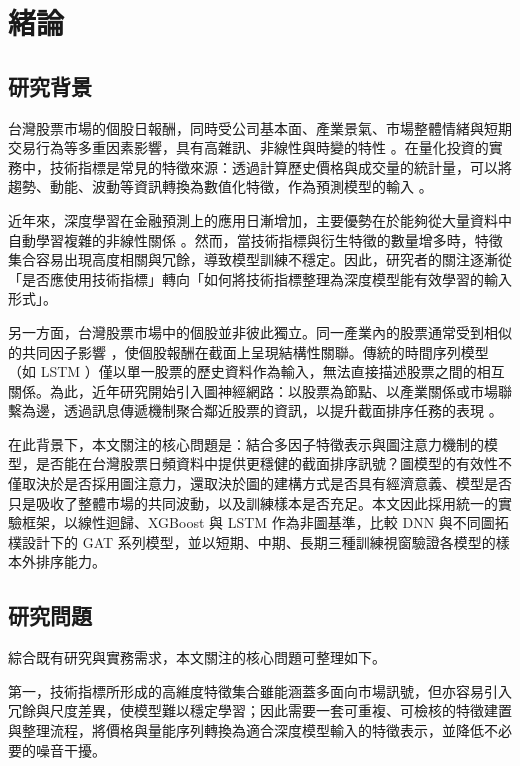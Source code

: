 \chapter{緒論}
\label{ch:intro}

\section{研究背景}
\label{sec:background}

台灣股票市場的個股日報酬，同時受公司基本面、產業景氣、市場整體情緒與短期交易行為等多重因素影響，具有高雜訊、非線性與時變的特性 \cite{gu2020empirical}。在量化投資的實務中，技術指標是常見的特徵來源：透過計算歷史價格與成交量的統計量，可以將趨勢、動能、波動等資訊轉換為數值化特徵，作為預測模型的輸入 \cite{Brock1992SimpleTT, LIN2018103}。

近年來，深度學習在金融預測上的應用日漸增加，主要優勢在於能夠從大量資料中自動學習複雜的非線性關係 \cite{gu2020empirical, sezer2019dl_fin_survey}。然而，當技術指標與衍生特徵的數量增多時，特徵集合容易出現高度相關與冗餘，導致模型訓練不穩定。因此，研究者的關注逐漸從「是否應使用技術指標」轉向「如何將技術指標整理為深度模型能有效學習的輸入形式」\cite{li2020stock}。

另一方面，台灣股票市場中的個股並非彼此獨立。同一產業內的股票通常受到相似的共同因子影響 \cite{FAMA19933, fama1992cross_section}，使個股報酬在截面上呈現結構性關聯。傳統的時間序列模型（如 LSTM \cite{hochreiter1997lstm}）僅以單一股票的歷史資料作為輸入，無法直接描述股票之間的相互關係。為此，近年研究開始引入圖神經網路：以股票為節點、以產業關係或市場聯繫為邊，透過訊息傳遞機制聚合鄰近股票的資訊，以提升截面排序任務的表現 \cite{velickovic2018gat, wu2020comprehensive, song2023stock}。

在此背景下，本文關注的核心問題是：結合多因子特徵表示與圖注意力機制的模型，是否能在台灣股票日頻資料中提供更穩健的截面排序訊號？圖模型的有效性不僅取決於是否採用圖注意力，還取決於圖的建構方式是否具有經濟意義、模型是否只是吸收了整體市場的共同波動，以及訓練樣本是否充足。本文因此採用統一的實驗框架，以線性迴歸、XGBoost 與 LSTM 作為非圖基準，比較 DNN 與不同圖拓樸設計下的 GAT 系列模型，並以短期、中期、長期三種訓練視窗驗證各模型的樣本外排序能力。

\section{研究問題}
\label{sec:problem}

綜合既有研究與實務需求，本文關注的核心問題可整理如下。

第一，技術指標所形成的高維度特徵集合雖能涵蓋多面向市場訊號，但亦容易引入冗餘與尺度差異，使模型難以穩定學習；因此需要一套可重複、可檢核的特徵建置與整理流程，將價格與量能序列轉換為適合深度模型輸入的特徵表示，並降低不必要的噪音干擾。

